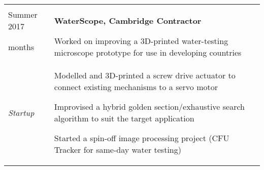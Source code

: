 \documentclass[letterpaper, 10pt]{article}
\begin{document}
\begin{tabularx}{\linewidth}{>{\raggedleft}p{2.2cm}|X}
\begin{compact}
	\vspace{-.5\baselineskip}
\end{compact}\\
Summer 2017 & \textbf{WaterScope, Cambridge \hfill Contractor}\\
2 months & Worked on improving a 3D-printed water-testing microscope prototype for use in developing countries\\
\textit{Startup} &
\vspace{-.5\baselineskip}
\begin{compact}
	\item Modelled and 3D-printed a screw drive actuator to connect existing mechanisms to a servo motor
	\item Improvised a hybrid golden section/exhaustive search algorithm to suit the target application
    \item Started a spin-off image processing project (CFU Tracker for same-day water testing)
	\vspace{-\baselineskip}
\end{compact}
\end{tabularx}

\vspace{-0.5\baselineskip}

\end{document}

